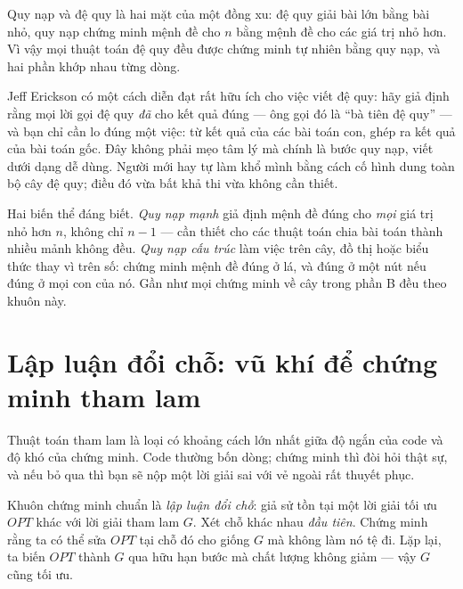 \documentclass[../../algorithm.tex]{subfiles}
\begin{document}
Quy nạp và đệ quy là hai mặt của một đồng xu: đệ quy giải bài lớn bằng bài nhỏ, quy nạp chứng minh mệnh đề cho \(n\) bằng mệnh đề cho các giá trị nhỏ hơn. Vì vậy mọi thuật toán đệ quy đều được chứng minh tự nhiên bằng quy nạp, và hai phần khớp nhau từng dòng.

Jeff Erickson\cite{erickson2019} có một cách diễn đạt rất hữu ích cho việc viết đệ quy: hãy giả định rằng mọi lời gọi đệ quy \emph{đã} cho kết quả đúng --- ông gọi đó là ``bà tiên đệ quy'' --- và bạn chỉ cần lo đúng một việc: từ kết quả của các bài toán con, ghép ra kết quả của bài toán gốc. Đây không phải mẹo tâm lý mà chính là bước quy nạp, viết dưới dạng dễ dùng. Người mới hay tự làm khổ mình bằng cách cố hình dung toàn bộ cây đệ quy; điều đó vừa bất khả thi vừa không cần thiết.

Hai biến thể đáng biết. \emph{Quy nạp mạnh} giả định mệnh đề đúng cho \emph{mọi} giá trị nhỏ hơn \(n\), không chỉ \(n-1\) --- cần thiết cho các thuật toán chia bài toán thành nhiều mảnh không đều. \emph{Quy nạp cấu trúc} làm việc trên cây, đồ thị hoặc biểu thức thay vì trên số: chứng minh mệnh đề đúng ở lá, và đúng ở một nút nếu đúng ở mọi con của nó. Gần như mọi chứng minh về cây trong phần B đều theo khuôn này.

\section{Lập luận đổi chỗ: vũ khí để chứng minh tham lam}

Thuật toán tham lam là loại có khoảng cách lớn nhất giữa độ ngắn của code và độ khó của chứng minh. Code thường bốn dòng; chứng minh thì đòi hỏi thật sự, và nếu bỏ qua thì bạn sẽ nộp một lời giải sai với vẻ ngoài rất thuyết phục.

Khuôn chứng minh chuẩn là \emph{lập luận đổi chỗ}: giả sử tồn tại một lời giải tối ưu \(OPT\) khác với lời giải tham lam \(G\). Xét chỗ khác nhau \emph{đầu tiên}. Chứng minh rằng ta có thể sửa \(OPT\) tại chỗ đó cho giống \(G\) mà không làm nó tệ đi. Lặp lại, ta biến \(OPT\) thành \(G\) qua hữu hạn bước mà chất lượng không giảm --- vậy \(G\) cũng tối ưu.
\end{document}
